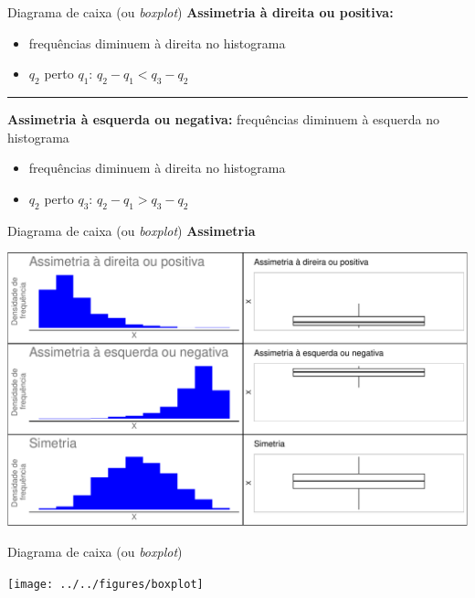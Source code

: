 \documentclass[
  10pt,
  ignorenonframetext,
]{beamer}
\providecommand{\tightlist}{%
  \setlength{\itemsep}{0pt}\setlength{\parskip}{0pt}}
\begin{document}
\begin{frame}{Diagrama de caixa (ou \emph{boxplot})}
\protect\hypertarget{diagrama-de-caixa-ou-boxplot-1}{}
\textbf{Assimetria à direita ou positiva:}

\begin{itemize}
\tightlist
\item
  frequências diminuem à direita no histograma
\item
  \(q_2\) perto \(q_1\): \(q_2 - q_1 < q_3 - q_2\)
\end{itemize}

\rule{\textwidth}{0.5pt}

\textbf{Assimetria à esquerda ou negativa:} frequências diminuem à
esquerda no histograma

\begin{itemize}
\tightlist
\item
  frequências diminuem à direita no histograma
\item
  \(q_2\) perto \(q_3\): \(q_2 - q_1 > q_3 - q_2\)
\end{itemize}
\end{frame}

\begin{frame}{Diagrama de caixa (ou \emph{boxplot})}
\protect\hypertarget{diagrama-de-caixa-ou-boxplot-2}{}
\textbf{Assimetria}

\begin{center}\includegraphics[width=1\linewidth]{aulas_files/figure-beamer/unnamed-chunk-67-1} \end{center}
\end{frame}

\begin{frame}{Diagrama de caixa (ou \emph{boxplot})}
\protect\hypertarget{diagrama-de-caixa-ou-boxplot-3}{}
\begin{center}\texttt{[image: ../../figures/boxplot]} \end{center}
\end{frame}
\end{document}
